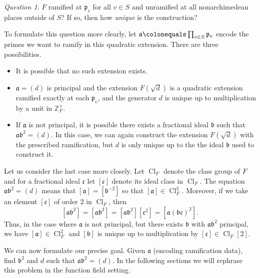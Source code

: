 \documentclass{dcthesis}
\newcommand{\ZZ}{\mathbb Z}
\DeclareMathOperator{\Cl}{Cl}
\numberwithin{equation}{section}
\theoremstyle{definition}
\theoremstyle{remark}
\newtheorem{question}[equation]{Question}
\begin{document}
{{{\begin{question}
      $F$ ramified at $\mathfrak{p}_v$
      for all $v\in S$
      and unramified at all
      nonarchimedean places outside of $S$?
      If so, then
      how \emph{unique} is the construction?
    \end{question}
    To formulate this question more clearly,
    let
    $
      \mathfrak{a}\colonequals
      \prod_{v\in S}\mathfrak{p}_v
    $
    encode the primes
    we want to ramify in this quadratic extension.
    There are three possibilities.
    \begin{itemize}
      \item
        It is possible that no such
        extension exists.
      \item
        $\mathfrak{a}=(d)$ is principal
        and the extension
        $F(\sqrt{d})$ is a quadratic extension
        ramified exactly at each $\mathfrak{p}_v$,
        and the generator $d$ is unique
        up to multiplication
        by a unit in $\ZZ_F^\times$.
      \item
        If $\mathfrak{a}$ is not principal,
        it is possible there
        exists a fractional ideal
        $\mathfrak{b}$ such that
        $\mathfrak{a}\mathfrak{b}^2=(d)$.
        In this case,
        we can again construct the extension
        $F(\sqrt{d})$ with the prescribed
        ramification,
        but $d$ is only unique up to
        the the ideal $\mathfrak{b}$ used
        to construct it.
    \end{itemize}
    Let us consider the last case more closely.
    Let $\Cl_F$ denote the class group of $F$
    and for a fractional ideal
    $\mathfrak{c}$ let $[\mathfrak{c}]$
    denote its ideal class in $\Cl_F$.
    The equation $\mathfrak{a}\mathfrak{b}^2=(d)$
    means that $[\mathfrak{a}] = [\mathfrak{b}^{-2}]$
    so that $[\mathfrak{a}]\in\Cl_F^2$.
    Moreover, if we take an element
    $[\mathfrak{c}]$
    of order $2$
    in $\Cl_F$,
    then
    \begin{equation}
      \label{eqn:twotorsionintheclassgroup}
      [\mathfrak{a}\mathfrak{b}^2]
      =[\mathfrak{a}\mathfrak{b}^2]
      =[\mathfrak{a}\mathfrak{b}^2][\mathfrak{c}^2]
      =[\mathfrak{a}(\mathfrak{bc})^2].
    \end{equation}
    Thus,
    in the case where $\mathfrak{a}$ is not
    principal,
    but there exists $\mathfrak{b}$ with
    $\mathfrak{a}\mathfrak{b}^2$ principal,
    we have
    $[\mathfrak{a}]\in\Cl_F^2$ and
    $[\mathfrak{b}]$ is unique up to
    multiplication by $[\mathfrak{c}]\in\Cl_F[2]$.
    \par
    We can now formulate our precise goal.
    Given $\mathfrak{a}$
    (encoding ramification data),
    find $\mathfrak{b}^2$ and $d$ such that
    $\mathfrak{a}\mathfrak{b}^2=(d)$.
    In the following sections we will rephrase this
    problem in the function field setting.
  }
}}
\end{document}
